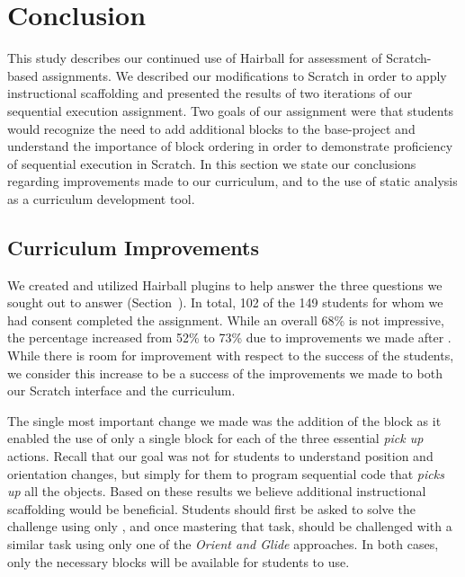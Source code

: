 \section{Conclusion} 
This study describes our continued use of Hairball for assessment of
Scratch-based assignments. We described our modifications to Scratch in order
to apply instructional scaffolding and presented the results of two iterations
of our sequential execution assignment. Two goals of our assignment were that
students would recognize the need to add additional blocks to the base-project
and understand the importance of block ordering in order to demonstrate
proficiency of sequential execution in Scratch. In this section we state our
conclusions regarding improvements made to our curriculum, and to the use of
static analysis as a curriculum development tool.

\subsection{Curriculum Improvements}
We created and utilized Hairball plugins to help answer the three questions we
sought out to answer (Section~). In total, 102 of the 149
students for whom we had consent completed the assignment. While an overall
68\% is not impressive, the percentage increased from 52\% to 73\% due to
improvements we made after \sone{}. While there is room for improvement with
respect to the success of the students, we consider this increase to be a
success of the improvements we made to both our Scratch interface and the
curriculum.

The single most important change we made was the addition of the \glideto{}
block as it enabled the use of only a single block for each of the three
essential \emph{pick up} actions. Recall that our goal was not for students to
understand position and orientation changes, but simply for them to program
sequential code that \emph{picks up} all the objects. Based on these results we
believe additional instructional scaffolding would be beneficial. Students
should first be asked to solve the challenge using only \glideto{}, and once
mastering that task, should be challenged with a similar task using only one of
the \emph{Orient and Glide} approaches. In both cases, only the necessary
blocks will be available for students to use.

